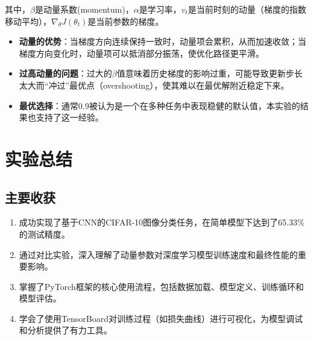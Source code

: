 \documentclass[12pt,a4paper,UTF8]{ctexart}
\begin{document}
其中，$\beta$是动量系数(momentum)，$\alpha$是学习率，$v_t$是当前时刻的动量（梯度的指数移动平均），$\nabla_\theta J(\theta_t)$是当前参数的梯度。

\begin{itemize}
    \item \textbf{动量的优势}：当梯度方向连续保持一致时，动量项会累积，从而加速收敛；当梯度方向变化时，动量项可以抵消部分振荡，使优化路径更平滑。
    \item \textbf{过高动量的问题}：过大的$\beta$值意味着历史梯度的影响过重，可能导致更新步长太大而“冲过”最优点（overshooting），使其难以在最优解附近稳定下来。
    \item \textbf{最优选择}：通常0.9被认为是一个在多种任务中表现稳健的默认值，本实验的结果也支持了这一经验。
\end{itemize}

\section{实验总结}
\subsection{主要收获}
\begin{enumerate}
    \item 成功实现了基于CNN的CIFAR-10图像分类任务，在简单模型下达到了65.33\%的测试精度。
    \item 通过对比实验，深入理解了动量参数对深度学习模型训练速度和最终性能的重要影响。
    \item 掌握了PyTorch框架的核心使用流程，包括数据加载、模型定义、训练循环和模型评估。
    \item 学会了使用TensorBoard对训练过程（如损失曲线）进行可视化，为模型调试和分析提供了有力工具。
\end{enumerate}
\end{document}
